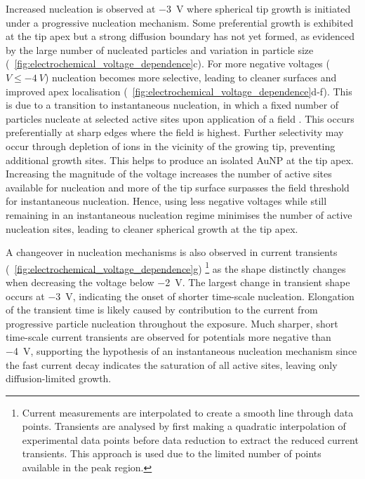 \documentclass{article}
\begin{document}
Increased nucleation is observed at \SI{-3}{V} where spherical tip growth is initiated under a progressive nucleation mechanism. Some preferential growth is exhibited at the tip apex but a strong diffusion boundary has not yet formed, as evidenced by the large number of nucleated particles and variation in particle size (\figurename~\ref{fig:electrochemical_voltage_dependence}c). For more negative voltages ($V \leq \SI{-4}{V}$) nucleation becomes more selective, leading to cleaner surfaces and improved apex localisation (\figurename~\ref{fig:electrochemical_voltage_dependence}d-f). This is due to a transition to instantaneous nucleation, in which a fixed number of particles nucleate at selected active sites upon application of a field \cite{hyde2003}. This occurs preferentially at sharp edges where the field is highest. Further selectivity may occur through depletion of ions in the vicinity of the growing tip, preventing additional growth sites. This helps to produce an isolated AuNP at the tip apex. Increasing the magnitude of the voltage increases the number of active sites available for nucleation and more of the tip surface surpasses the field threshold for instantaneous nucleation. Hence, using less negative voltages while still remaining in an instantaneous nucleation regime minimises the number of active nucleation sites, leading to cleaner spherical growth at the tip apex.

A changeover in nucleation mechanisms is also observed in current transients (\figurename~\ref{fig:electrochemical_voltage_dependence}g)%
\footnote{Current measurements are interpolated to create a smooth line through data points. Transients are analysed by first making a quadratic interpolation of experimental data points before data reduction to extract the reduced current transients. This approach is used due to the limited number of points available in the peak region.}
as the shape distinctly changes when decreasing the voltage below \SI{-2}{V}. The largest change in transient shape occurs at \SI{-3}{V}, indicating the onset of shorter time-scale nucleation. Elongation of the transient time is likely caused by contribution to the current from progressive particle nucleation throughout the exposure. Much sharper, short time-scale current transients are observed for potentials more negative than \SI{-4}{V}, supporting the hypothesis of an instantaneous nucleation mechanism since the fast current decay indicates the saturation of all active sites, leaving only diffusion-limited growth.
\end{document}
